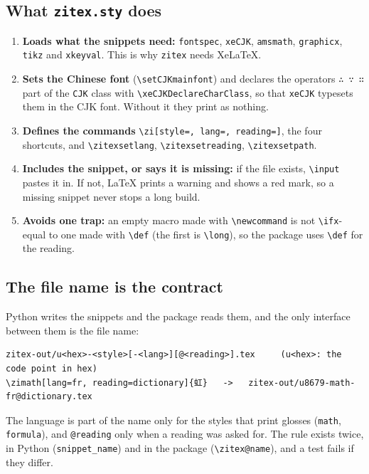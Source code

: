 \documentclass[11pt]{article}
\newcommand{\cmd}[1]{\texttt{\textbackslash #1}}               %
\newenvironment{syntax}{\par\smallskip\begin{minipage}{\linewidth}\footnotesize\setlength{\parindent}{0pt}\noindent\ignorespaces}
  {\end{minipage}\par\smallskip}
\begin{document}
\subsection{What \texttt{zitex.sty} does}
\begin{enumerate}
  \item \textbf{Loads what the snippets need:} \texttt{fontspec}, \texttt{xeCJK}, \texttt{amsmath}, \texttt{graphicx}, \texttt{tikz} and \texttt{xkeyval}. This is why \texttt{zitex} needs Xe\LaTeX.
  \item \textbf{Sets the Chinese font} (\cmd{setCJKmainfont}) and declares the operators \texttt{∴ ∵ ∷} part of the \texttt{CJK} class with \cmd{xeCJKDeclareCharClass}, so that \texttt{xeCJK} typesets them in the CJK font. Without it they print as nothing.
  \item \textbf{Defines the commands} \cmd{zi}\texttt{[style=, lang=, reading=]}, the four shortcuts, and \cmd{zitexsetlang}, \cmd{zitexsetreading}, \cmd{zitexsetpath}.
  \item \textbf{Includes the snippet, or says it is missing:} if the file exists, \cmd{input} pastes it in. If not, \LaTeX{} prints a warning and shows a red mark, so a missing snippet never stops a long build.
  \item \textbf{Avoids one trap:} an empty macro made with \cmd{newcommand} is not \cmd{ifx}-equal to one made with \cmd{def} (the first is \cmd{long}), so the package uses \cmd{def} for the reading.
\end{enumerate}

\subsection{The file name is the contract}
Python writes the snippets and the package reads them, and the only interface between them is the file name:

\begin{syntax}
\begin{verbatim}
zitex-out/u<hex>-<style>[-<lang>][@<reading>].tex     (u<hex>: the code point in hex)
\zimath[lang=fr, reading=dictionary]{虹}   ->   zitex-out/u8679-math-fr@dictionary.tex
\end{verbatim}
\end{syntax}

The language is part of the name only for the styles that print glosses (\texttt{math}, \texttt{formula}), and \texttt{@reading} only when a reading was asked for. The rule exists twice, in Python (\texttt{snippet\_name}) and in the package (\cmd{zitex@name}), and a test fails if they differ.
\end{document}
